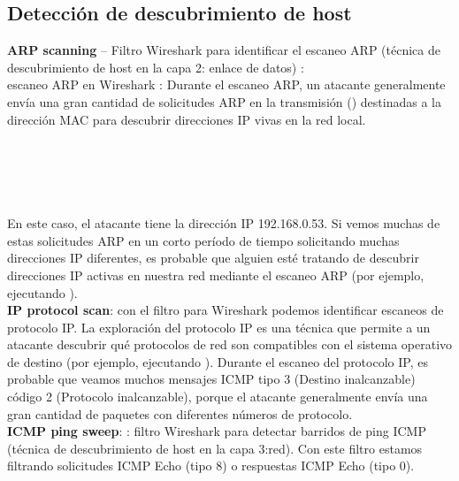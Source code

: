 \subsection{Detección de descubrimiento de host}
\textbf{ARP scanning} -- Filtro Wireshark para identificar el escaneo ARP (técnica de descubrimiento de host en la capa 2: enlace de datos)  :\\

\noindent escaneo ARP en Wireshark : Durante el escaneo ARP, un atacante generalmente envía una gran cantidad de solicitudes ARP en la transmisión () destinadas a la dirección MAC  para descubrir direcciones IP vivas en la red local. \\

\noindent{}\\
\\
\\
\\
\\

En este caso, el atacante tiene la dirección IP 192.168.0.53. Si vemos muchas de estas solicitudes ARP en un corto período de tiempo solicitando muchas direcciones IP diferentes, es probable que alguien esté tratando de descubrir direcciones IP activas en nuestra red mediante el escaneo ARP (por ejemplo, ejecutando ).\\

 
 \textbf{IP protocol scan}: con el filtro 	para  Wireshark podemos identificar escaneos de protocolo IP. La exploración del protocolo IP es una técnica que permite a un atacante descubrir qué protocolos de red son compatibles con el sistema operativo de destino (por ejemplo, ejecutando ). Durante el escaneo del protocolo IP, es probable que veamos muchos mensajes ICMP tipo 3 (Destino inalcanzable) código 2 (Protocolo inalcanzable), porque el atacante generalmente envía una gran cantidad de paquetes con diferentes números de protocolo.\\





 
 \textbf{ICMP ping sweep}: 	: filtro Wireshark para detectar barridos de ping ICMP (técnica de descubrimiento de host en la capa 3:red). Con este filtro estamos filtrando solicitudes ICMP Echo (tipo 8) o respuestas ICMP Echo (tipo 0).

